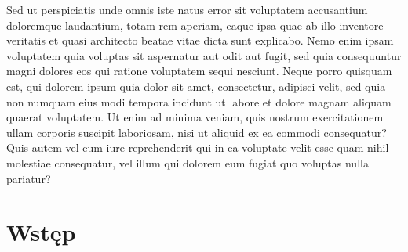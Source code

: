 \documentclass[11pt,a4paper,fleqn,leqno,titlepage]{article}
\begin{document}
Sed ut perspiciatis unde omnis iste natus error sit voluptatem accusantium doloremque laudantium, totam rem aperiam, eaque ipsa quae ab illo inventore veritatis et quasi architecto beatae vitae dicta sunt explicabo. Nemo enim ipsam voluptatem quia voluptas sit aspernatur aut odit aut fugit, sed quia consequuntur magni dolores eos qui ratione voluptatem sequi nesciunt. Neque porro quisquam est, qui dolorem ipsum quia dolor sit amet, consectetur, adipisci velit, sed quia non numquam eius modi tempora incidunt ut labore et dolore magnam aliquam quaerat voluptatem. Ut enim ad minima veniam, quis nostrum exercitationem ullam corporis suscipit laboriosam, nisi ut aliquid ex ea commodi consequatur? Quis autem vel eum iure reprehenderit qui in ea voluptate velit esse quam nihil molestiae consequatur, vel illum qui dolorem eum fugiat quo voluptas nulla pariatur?

\section{Wstęp}
\end{document}
